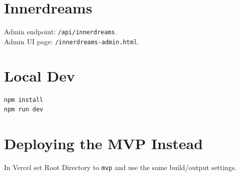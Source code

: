 \documentclass[11pt]{article}
\begin{document}
\section*{Innerdreams}
Admin endpoint: \texttt{/api/innerdreams}.\\
Admin UI page: \texttt{/innerdreams-admin.html}.

\section*{Local Dev}
\begin{verbatim}
npm install
npm run dev
\end{verbatim}

\section*{Deploying the MVP Instead}
In Vercel set Root Directory to \texttt{mvp} and use the same build/output settings.
\end{document}
